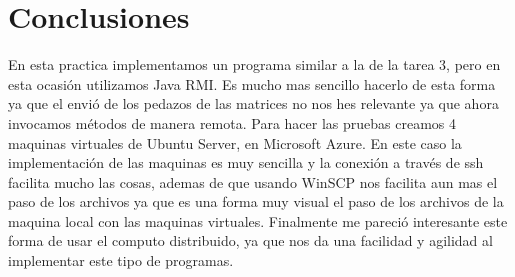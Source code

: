 \documentclass[11pt]{article}
\begin{document}
	\section{Conclusiones}
	En esta practica implementamos un programa similar a la de la tarea 3, pero en esta ocasión utilizamos Java RMI. Es mucho mas sencillo hacerlo de esta forma ya que el envió de los pedazos de las matrices no nos hes relevante ya que ahora invocamos métodos de manera remota. Para hacer las pruebas creamos 4 maquinas virtuales de Ubuntu Server, en Microsoft Azure. En este caso la implementación de las maquinas es muy sencilla y la conexión a través de ssh facilita mucho las cosas, ademas de que usando WinSCP nos facilita aun mas el paso de los archivos ya que es una forma muy visual el paso de los archivos de la maquina local con las maquinas virtuales. Finalmente me pareció interesante este forma de usar el computo distribuido, ya que nos da una facilidad y agilidad al implementar este tipo de programas.
\end{document}
